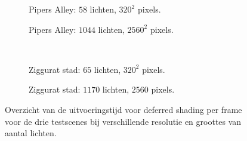 \begin{figure}[t]
\begin{adjustbox}{minipage=\textwidth, scale=0.55}
\begin{subfigure}[b]{0.8\textwidth}
      \caption{Pipers Alley: $58$ lichten, $320^2$ pixels.}
      \label{fig:ts-frames-deferred:alley-low}
    \end{subfigure}
  \end{adjustbox}\hspace{-0.075\textwidth}  %
  \begin{adjustbox}{minipage=\textwidth, scale=0.55}
    \begin{subfigure}[b]{0.8\textwidth}
      \centering
      \def\svgwidth{\textwidth}
      
      \caption{Pipers Alley: $1044$ lichten, $2560^2$ pixels.}
      \label{fig:ts-frames-deferred:alley-high}
    \end{subfigure}
  \end{adjustbox} \\
  \begin{adjustbox}{minipage=\textwidth, scale=0.55}
    \begin{subfigure}[b]{0.8\textwidth}
      \centering
      \def\svgwidth{\textwidth}
      
      \caption{Ziggurat stad: $65$ lichten, $320^2$ pixels.}
      \label{fig:ts-frames-deferred:city-low}
    \end{subfigure}
  \end{adjustbox}\hspace{-0.075\textwidth}  %
  \begin{adjustbox}{minipage=\textwidth, scale=0.55}
    \begin{subfigure}[b]{0.8\textwidth}
      \centering
      \def\svgwidth{\textwidth}
      
      \caption{Ziggurat stad: $1170$ lichten, $2560$ pixels.}
      \label{fig:ts-frames-deferred:city-high}
    \end{subfigure}
  \end{adjustbox}
  \caption{Overzicht van de uitvoeringstijd voor deferred shading per frame voor de
           drie testscenes bij verschillende resolutie en groottes van aantal
           lichten.}
  \label{fig:ts-frames-deferred}
\end{figure}

